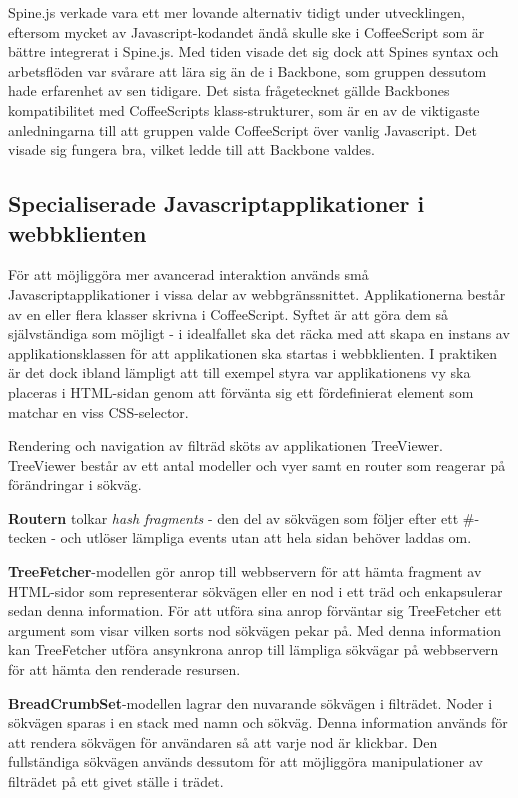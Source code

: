Spine.js verkade vara ett mer lovande alternativ tidigt under utvecklingen, eftersom mycket av Javascript-kodandet ändå skulle ske i CoffeeScript som är bättre integrerat i Spine.js. Med tiden visade det sig dock att Spines syntax och arbetsflöden var svårare att lära sig än de i Backbone, som gruppen dessutom hade erfarenhet av sen tidigare. Det sista frågetecknet gällde Backbones kompatibilitet med CoffeeScripts klass-strukturer, som är en av de viktigaste anledningarna till att gruppen valde CoffeeScript över vanlig Javascript. Det visade sig fungera bra, vilket ledde till att Backbone valdes.

\subsection{Specialiserade Javascriptapplikationer i webbklienten}
För att möjliggöra mer avancerad interaktion används små Javascriptapplikationer i vissa delar av webbgränssnittet. Applikationerna består av en eller flera klasser skrivna i CoffeeScript. Syftet är att göra dem så självständiga som möjligt - i idealfallet ska det räcka med att skapa en instans av applikationsklassen för att applikationen ska startas i webbklienten. I praktiken är det dock ibland lämpligt att till exempel styra var applikationens vy ska placeras i HTML-sidan genom att förvänta sig ett fördefinierat element som matchar en viss CSS-selector.

Rendering och navigation av filträd sköts av applikationen TreeViewer. TreeViewer består av ett antal modeller och vyer samt en router som reagerar på förändringar i sökväg. 

{\bf Routern} tolkar \emph{hash fragments} - den del av sökvägen som följer efter ett \#-tecken - och utlöser lämpliga events utan att hela sidan behöver laddas om.


{\bf TreeFetcher}-modellen gör anrop till webbservern för att hämta fragment av HTML-sidor som representerar sökvägen eller en nod i ett träd och enkapsulerar sedan denna information. För att utföra sina anrop förväntar sig TreeFetcher ett argument som visar vilken sorts nod sökvägen pekar på. Med denna information kan TreeFetcher utföra ansynkrona anrop till lämpliga sökvägar på webbservern för att hämta den renderade resursen.

{\bf BreadCrumbSet}-modellen lagrar den nuvarande sökvägen i filträdet. Noder i sökvägen sparas i en stack med namn och sökväg. Denna information används för att rendera sökvägen för användaren så att varje nod är klickbar. Den fullständiga sökvägen används dessutom för att möjliggöra manipulationer av filträdet på ett givet ställe i trädet.

